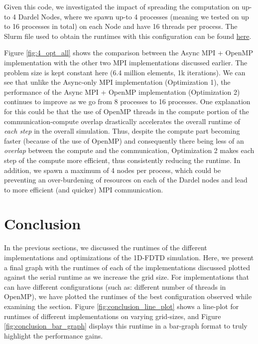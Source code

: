 \documentclass[a4paper,10pt]{article}
\begin{document}
\begin{multicols}{2}
Given this code, we investigated the impact of spreading the computation on up-to 4 Dardel Nodes, where we spawn up-to 4 processes (meaning we tested on up to 16 processes in total) on each Node and have 16 threads per process. The Slurm file used to obtain the runtimes with this configuration can be found \href{https://github.com/paulmyr/DD2356-MethodsHPC/blob/master/5_project/4_opt/run_async_omp_opt.sh}{here}. 

Figure \ref{fig:4_opt_all} shows the comparison between the Async MPI + OpenMP implementation with the other two MPI implementations discussed earlier. The problem size is kept constant here (6.4 million elements, 1k iterations). We can see that unlike the Async-only MPI implementation (Optimization 1), the performance of the Async MPI + OpenMP implementation (Optimization 2) continues to improve as we go from 8 processes to 16 processes. One explanation for this could be that the use of OpenMP threads in the compute portion of the communication-compute overlap drastically accelerates the overall runtime of \textit{each step} in the overall simulation. Thus, despite the compute part becoming faster (because of the use of OpenMP) and consequently there being less of an \textit{overlap} between the compute and the communication, Optimization 2 makes each step of the compute more efficient, thus consistently reducing the runtime. In addition, we spawn a maximum of 4 nodes per process, which could be preventing an over-burdening of resources on each of the Dardel nodes and lead to more efficient (and quicker) MPI communication.

\section{Conclusion}
In the previous sections, we discussed the runtimes of the different implementations and optimizations of the 1D-FDTD simulation. Here, we present a final graph with the runtimes of each of the implementations discussed plotted against the serial runtime as we increase the grid size. For implementations that can have different configurations (such as: different number of threads in OpenMP), we have plotted the runtimes of the best configuration observed while examining the section. Figure \ref{fig:conclusion_line_plot} shows a line-plot for runtimes of different implementations on varying grid-sizes, and Figure \ref{fig:conclusion_bar_graph} displays this runtime in a bar-graph format to truly highlight the performance gains.


\end{multicols}
\end{document}
